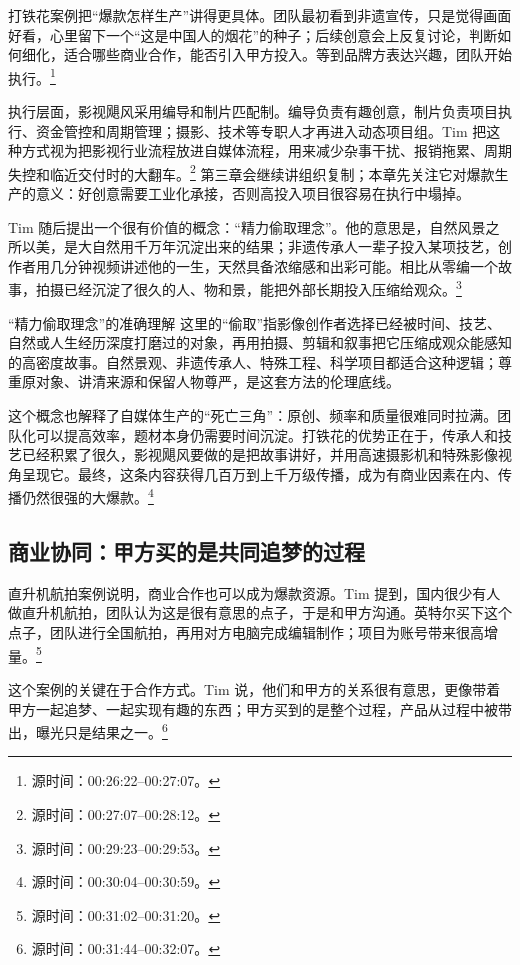 \documentclass[a4paper]{article}
\begin{document}
打铁花案例把“爆款怎样生产”讲得更具体。团队最初看到非遗宣传，只是觉得画面好看，心里留下一个“这是中国人的烟花”的种子；后续创意会上反复讨论，判断如何细化，适合哪些商业合作，能否引入甲方投入。等到品牌方表达兴趣，团队开始执行。\footnote{源时间：00:26:22--00:27:07。}

执行层面，影视飓风采用编导和制片匹配制。编导负责有趣创意，制片负责项目执行、资金管控和周期管理；摄影、技术等专职人才再进入动态项目组。Tim 把这种方式视为把影视行业流程放进自媒体流程，用来减少杂事干扰、报销拖累、周期失控和临近交付时的大翻车。\footnote{源时间：00:27:07--00:28:12。} 第三章会继续讲组织复制；本章先关注它对爆款生产的意义：好创意需要工业化承接，否则高投入项目很容易在执行中塌掉。

Tim 随后提出一个很有价值的概念：“精力偷取理念”。他的意思是，自然风景之所以美，是大自然用千万年沉淀出来的结果；非遗传承人一辈子投入某项技艺，创作者用几分钟视频讲述他的一生，天然具备浓缩感和出彩可能。相比从零编一个故事，拍摄已经沉淀了很久的人、物和景，能把外部长期投入压缩给观众。\footnote{源时间：00:29:23--00:29:53。}

\begin{importantbox}{“精力偷取理念”的准确理解}
这里的“偷取”指影像创作者选择已经被时间、技艺、自然或人生经历深度打磨过的对象，再用拍摄、剪辑和叙事把它压缩成观众能感知的高密度故事。自然景观、非遗传承人、特殊工程、科学项目都适合这种逻辑；尊重原对象、讲清来源和保留人物尊严，是这套方法的伦理底线。
\end{importantbox}

这个概念也解释了自媒体生产的“死亡三角”：原创、频率和质量很难同时拉满。团队化可以提高效率，题材本身仍需要时间沉淀。打铁花的优势正在于，传承人和技艺已经积累了很久，影视飓风要做的是把故事讲好，并用高速摄影机和特殊影像视角呈现它。最终，这条内容获得几百万到上千万级传播，成为有商业因素在内、传播仍然很强的大爆款。\footnote{源时间：00:30:04--00:30:59。}

\subsection{商业协同：甲方买的是共同追梦的过程}

直升机航拍案例说明，商业合作也可以成为爆款资源。Tim 提到，国内很少有人做直升机航拍，团队认为这是很有意思的点子，于是和甲方沟通。英特尔买下这个点子，团队进行全国航拍，再用对方电脑完成编辑制作；项目为账号带来很高增量。\footnote{源时间：00:31:02--00:31:20。}

这个案例的关键在于合作方式。Tim 说，他们和甲方的关系很有意思，更像带着甲方一起追梦、一起实现有趣的东西；甲方买到的是整个过程，产品从过程中被带出，曝光只是结果之一。\footnote{源时间：00:31:44--00:32:07。}
\end{document}
